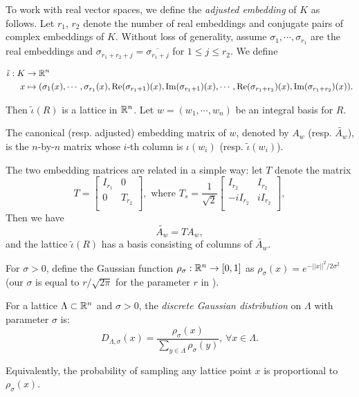 \documentclass{amsart}
\begin{document}
To work with real vector spaces, we define the {\it adjusted embedding} of $K$ as follows. Let $r_1$, $r_2$ denote the number of real embeddings and conjugate pairs of complex embeddings of $K$. Without loss of generality, assume $\sigma_1, \cdots, \sigma_{r_1}$ are the real embeddings and $\sigma_{r_1+r_2+j} = \overline{\sigma_{r_1 + j}}$ for $1 \leq j \leq r_2$. We define

\begin{align*}
    \tilde{\iota}: K & \to \mathbb{R}^n \\
    x & \mapsto (\sigma_1(x), \cdots, \sigma_{r_1}(x), \Re(\sigma_{r_1+1})(x), \Im(\sigma_{r_1+1})(x), \cdots,  \Re(\sigma_{r_1+r_2})(x), \Im(\sigma_{r_1+r_2})(x)).
\end{align*}

Then $\tilde{\iota}(R)$ is a lattice in $\mathbb{R}^n$. Let $w = (w_1, \cdots , w_n)$ be an integral basis for $R$.

\begin{Definition}
The canonical (resp. adjusted) embedding matrix of $w$, denoted by $A_w$ (resp. $\widetilde{A_w}$), is the $n$-by-$n$ matrix whose $i$-th column is $\iota(w_i)$ (resp. $\tilde{\iota}(w_i)$).
\end{Definition}

The two embedding matrices are related in a simple way:
let $T$ denote the matrix
\[
T = \begin{bmatrix}
    I_{r_1}  & 0  \\
    0     & T_{r_2} \\
\end{bmatrix},
\mbox{ where } T_s = \frac{1}{\sqrt{2}} \begin{bmatrix}
    I_{r_2}  & I_{r_2} \\
    -iI_{r_2}     & iI_{r_2} \\
\end{bmatrix},
\]
Then we have
$$\tilde{A_{w}} = T A_{w},$$
and the lattice $\tilde{\iota}(R)$ has a basis consisting of columns of $\widetilde{A_{w}}$.

For $\sigma > 0$, define the Gaussian function $\rho_\sigma: \mathbb{R}^n \to [0,1]$ as $\rho_\sigma(x) = e^{-||x||^2/2\sigma^2}$ (our $\sigma$ is equal to $r/\sqrt{2\pi}$ for the parameter $r$ in \cite{lyubashevsky2013ideal}).
\begin{Definition}
For a lattice $\Lambda \subset \mathbb{R}^n$ and $\sigma > 0$, the {\it discrete Gaussian distribution} on $\Lambda$ with parameter $\sigma$ is:
\[
    D_{\Lambda, \sigma}(x) = \frac{\rho_\sigma(x)}{\sum_{y \in\Lambda} \rho_\sigma(y)}, \, \forall x \in \Lambda.
\]
\end{Definition}
Equivalently, the probability of sampling any lattice point $x$ is proportional to $\rho_\sigma(x)$.
\end{document}
